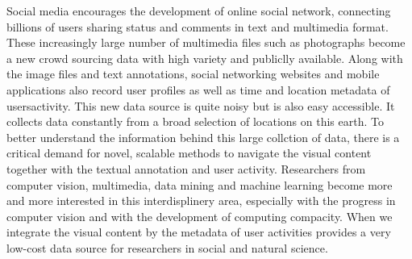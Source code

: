 Social media encourages the development of online social network, connecting billions of users sharing status and comments in text and multimedia format.
These increasingly large number of multimedia files such as photographs become a new crowd sourcing data with high variety and publiclly available.
Along with the image files and text annotations, social networking websites and mobile applications also record user profiles as well as time and location metadata of users\textquotesingle activity.
This new data source is quite noisy but is also easy accessible. 
It collects data constantly from a broad selection of locations on this earth. 
To better understand the information behind this large collction of data, there is a critical demand for novel, scalable methods to navigate the visual content together with the textual annotation and user activity.
Researchers from computer vision, multimedia, data mining and machine learning become more and more interested in this interdisplinery area, especially with the progress in computer vision and with the development of computing compacity.
When we integrate the visual content by the metadata of user activities
provides a very low-cost data source for researchers in social and natural science.
